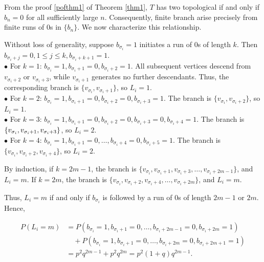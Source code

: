 \documentclass[10pt,twoside]{article}
\begin{document}
From the proof \ref{pofthm1} of Theorem \ref{thm1}, $T$ has two topological if and only if $b_n = 0$ for all sufficiently large $n$. Consequently, finite branch arise precisely from finite runs of $0$s in $\{b_n\}$. We now characterize this relationship.

Without loss of generality, suppose $b_{\sigma_i} = 1$ initiates a run of $0$s of length $k$. Then $b_{\sigma_i+j} = 0, 1 \leq j \leq k, b_{\sigma_i+k+1} = 1$.\\
$\bullet$ For $k = 1$: $b_{\sigma_i} = 1, b_{\sigma_i + 1} = 0, b_{\sigma_i + 2} = 1$. All subsequent vertices descend from $v_{\sigma_i + 2}$ or $v_{\sigma_i + 3}$, while $v_{\sigma_i + 1}$ generates no further descendants. Thus, the corresponding branch is $\{v_{\sigma_i}, v_{\sigma_i + 1}\}$, so $L_i = 1$.\\
$\bullet$ For $k = 2$: $b_{\sigma_i} = 1,  b_{\sigma_i + 1} = 0, b_{\sigma_i + 2} = 0, b_{\sigma_i + 3} = 1$. The branch is $\{v_{\sigma_i}, v_{\sigma_i + 2}\}$, so $L_i = 1$.\\
$\bullet$ For $k = 3$: $b_{\sigma_i} = 1,  b_{\sigma_i + 1} = 0, b_{\sigma_i + 2} = 0, b_{\sigma_i + 3} = 0, b_{\sigma_i + 4} = 1$. The branch is $\{v_{\sigma_i}, v_{\sigma_i + 1},\\ v_{\sigma_i + 3}\}$, so $L_i = 2$.\\
$\bullet$ For $k = 4$: $b_{\sigma_i} = 1, b_{\sigma_i + 1} = 0, \ldots, b_{\sigma_i + 4} = 0, b_{\sigma_i + 5} = 1$. The branch is $\{v_{\sigma_i}, v_{\sigma_i + 2}, v_{\sigma_i + 4}\}$, so $L_i = 2$.

By induction, if $k = 2m - 1$, the branch is $\{v_{\sigma_i}, v_{\sigma_i + 1}, v_{\sigma_i + 3}, \ldots, v_{\sigma_i + 2m - 1}\}$, and $L_i = m$. If $k = 2m$, the branch is $\{v_{\sigma_i}, v_{\sigma_i + 2}, v_{\sigma_i + 4}, \ldots, v_{\sigma_i + 2m}\}$, and $L_i = m$.

Thus, $L_i = m$ if and only if $b_{\sigma_i}$ is followed by a run of $0$s of length $2m-1$ or $2m$. Hence,
 

$$
\begin{aligned}
P(L_i = m) &= P(b_{\sigma_i}=1, b_{\sigma_i+1}=0, \ldots, b_{\sigma_i+2m-1}=0, b_{\sigma_i+2m}=1) \\
&\quad + P(b_{\sigma_i}=1, b_{\sigma_i+1}=0, \ldots, b_{\sigma_i+2m}=0, b_{\sigma_i+2m+1}=1) \\
&= p^2 q^{2m-1} + p^2 q^{2m} = p^2 (1 + q) q^{2m-1}.
\end{aligned}
$$

 
\end{document}
